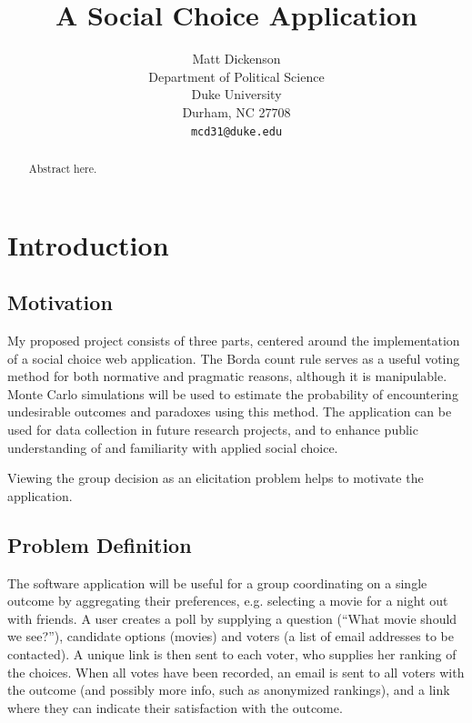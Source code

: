 \documentclass[12pt,letterpaper]{article} %
\title{A Social Choice Application}
\author{
Matt Dickenson\\
Department of Political Science\\
Duke University\\
Durham, NC 27708 \\
\texttt{mcd31@duke.edu}
}
\begin{document}
\begin{titlepage}

\clearpage
\maketitle
\thispagestyle{empty}

\begin{abstract}
Abstract here.
\end{abstract}

\end{titlepage}



\newpage

\section{Introduction}

\subsection{Motivation}


My proposed project consists of three parts, centered around the implementation of a social choice web application. The Borda count rule serves as a useful voting method for both normative and pragmatic reasons, although it is manipulable. Monte Carlo simulations will be used to estimate the probability of encountering undesirable outcomes and paradoxes using this method. The application can be used for data collection in future research projects, and to enhance public understanding of and familiarity with applied social choice.

Viewing the group decision as an elicitation problem helps to motivate the application.


\subsection{Problem Definition} 


The software application will be useful for a group coordinating on a single outcome by aggregating their preferences, e.g. selecting a movie for a night out with friends. A user creates a poll by supplying a question (``What movie should we see?''), candidate options (movies) and voters (a list of email addresses to be contacted). A unique link is then sent to each voter, who supplies her ranking of the choices. When all votes have been recorded, an email is sent to all voters with the outcome (and possibly more info, such as anonymized rankings), and a link where they can indicate their satisfaction with the outcome.
\end{document}
